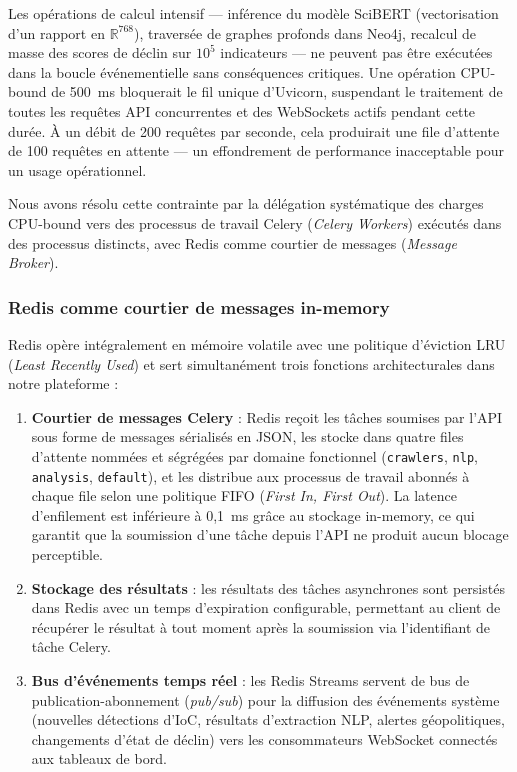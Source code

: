 Les opérations de calcul intensif --- inférence du modèle SciBERT (vectorisation d'un rapport en $\mathbb{R}^{768}$), traversée de graphes profonds dans Neo4j, recalcul de masse des scores de déclin sur $10^5$ indicateurs --- ne peuvent pas être exécutées dans la boucle événementielle sans conséquences critiques. Une opération CPU-bound de 500~ms bloquerait le fil unique d'Uvicorn, suspendant le traitement de toutes les requêtes API concurrentes et des WebSockets actifs pendant cette durée. À un débit de 200 requêtes par seconde, cela produirait une file d'attente de 100 requêtes en attente --- un effondrement de performance inacceptable pour un usage opérationnel.

Nous avons résolu cette contrainte par la délégation systématique des charges CPU-bound vers des processus de travail Celery (\textit{Celery Workers}) exécutés dans des processus distincts, avec Redis comme courtier de messages (\textit{Message Broker}).

\subsubsection{Redis comme courtier de messages in-memory}

Redis opère intégralement en mémoire volatile avec une politique d'éviction LRU (\textit{Least Recently Used}) et sert simultanément trois fonctions architecturales dans notre plateforme :

\begin{enumerate}
    \item \textbf{Courtier de messages Celery} : Redis reçoit les tâches soumises par l'API sous forme de messages sérialisés en JSON, les stocke dans quatre files d'attente nommées et ségrégées par domaine fonctionnel (\texttt{crawlers}, \texttt{nlp}, \texttt{analysis}, \texttt{default}), et les distribue aux processus de travail abonnés à chaque file selon une politique FIFO (\textit{First In, First Out}). La latence d'enfilement est inférieure à 0{,}1~ms grâce au stockage in-memory, ce qui garantit que la soumission d'une tâche depuis l'API ne produit aucun blocage perceptible.
    \item \textbf{Stockage des résultats} : les résultats des tâches asynchrones sont persistés dans Redis avec un temps d'expiration configurable, permettant au client de récupérer le résultat à tout moment après la soumission via l'identifiant de tâche Celery.
    \item \textbf{Bus d'événements temps réel} : les Redis Streams servent de bus de publication-abonnement (\textit{pub/sub}) pour la diffusion des événements système (nouvelles détections d'IoC, résultats d'extraction NLP, alertes géopolitiques, changements d'état de déclin) vers les consommateurs WebSocket connectés aux tableaux de bord.
\end{enumerate}

